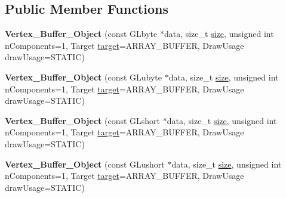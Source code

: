 \subsection*{Public Member Functions}
\begin{DoxyCompactItemize}
\item 
\mbox{\label{classprz_1_1_vertex___buffer___object_afe094cc200fa62b2104e59c896e330ae}} 
{\bfseries Vertex\+\_\+\+Buffer\+\_\+\+Object} (const G\+Lbyte $\ast$data, size\+\_\+t \mbox{\hyperlink{classprz_1_1_vertex___buffer___object_acc2dd595347b27c190d9542b4b624324}{size}}, unsigned int n\+Components=1, Target \mbox{\hyperlink{classprz_1_1_vertex___buffer___object_a093cc0098b6993768ebbc9a2c3efeced}{target}}=A\+R\+R\+A\+Y\+\_\+\+B\+U\+F\+F\+ER, Draw\+Usage draw\+Usage=S\+T\+A\+T\+IC)
\item 
\mbox{\label{classprz_1_1_vertex___buffer___object_a0328b70da8980eb19394ae223488ad33}} 
{\bfseries Vertex\+\_\+\+Buffer\+\_\+\+Object} (const G\+Lubyte $\ast$data, size\+\_\+t \mbox{\hyperlink{classprz_1_1_vertex___buffer___object_acc2dd595347b27c190d9542b4b624324}{size}}, unsigned int n\+Components=1, Target \mbox{\hyperlink{classprz_1_1_vertex___buffer___object_a093cc0098b6993768ebbc9a2c3efeced}{target}}=A\+R\+R\+A\+Y\+\_\+\+B\+U\+F\+F\+ER, Draw\+Usage draw\+Usage=S\+T\+A\+T\+IC)
\item 
\mbox{\label{classprz_1_1_vertex___buffer___object_a8bcd705519da61854d61684bb1a3d1dd}} 
{\bfseries Vertex\+\_\+\+Buffer\+\_\+\+Object} (const G\+Lshort $\ast$data, size\+\_\+t \mbox{\hyperlink{classprz_1_1_vertex___buffer___object_acc2dd595347b27c190d9542b4b624324}{size}}, unsigned int n\+Components=1, Target \mbox{\hyperlink{classprz_1_1_vertex___buffer___object_a093cc0098b6993768ebbc9a2c3efeced}{target}}=A\+R\+R\+A\+Y\+\_\+\+B\+U\+F\+F\+ER, Draw\+Usage draw\+Usage=S\+T\+A\+T\+IC)
\item 
\mbox{\label{classprz_1_1_vertex___buffer___object_a05d9595ec79ed40ee1a668bf01a9fd54}} 
{\bfseries Vertex\+\_\+\+Buffer\+\_\+\+Object} (const G\+Lushort $\ast$data, size\+\_\+t \mbox{\hyperlink{classprz_1_1_vertex___buffer___object_acc2dd595347b27c190d9542b4b624324}{size}}, unsigned int n\+Components=1, Target \mbox{\hyperlink{classprz_1_1_vertex___buffer___object_a093cc0098b6993768ebbc9a2c3efeced}{target}}=A\+R\+R\+A\+Y\+\_\+\+B\+U\+F\+F\+ER, Draw\+Usage draw\+Usage=S\+T\+A\+T\+IC)

\end{DoxyCompactItemize}
